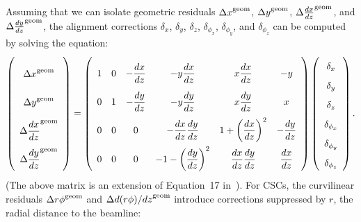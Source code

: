 Assuming that we can isolate geometric residuals ${\Delta
  x}^{\mbox{\scriptsize geom}}$, ${\Delta y}^{\mbox{\scriptsize
    geom}}$, ${\Delta \frac{dx}{dz}}^{\mbox{\scriptsize geom}}$, and
${\Delta \frac{dy}{dz}}^{\mbox{\scriptsize geom}}$, the alignment
corrections $\delta_x$, $\delta_y$, $\delta_z$, $\delta_{\phi_x}$,
$\delta_{\phi_y}$, and $\delta_{\phi_z}$ can be computed by solving
the equation:
\begin{equation}
\renewcommand{\arraystretch}{2.5}
\left(\begin{array}{c}
{\Delta x}^{\mbox{\scriptsize geom}} \\
{\Delta y}^{\mbox{\scriptsize geom}} \\
{\Delta \dfrac{dx}{dz}}^{\mbox{\scriptsize geom}} \\
{\Delta \dfrac{dy}{dz}}^{\mbox{\scriptsize geom}} \\
\end{array}\right)
=
{\renewcommand{\arraystretch}{2.5}
\left(\begin{array}{c c c c c c}
1 & 0 & -\dfrac{dx}{dz} & -y \dfrac{dx}{dz} & x \dfrac{dx}{dz} & -y \\
0 & 1 & -\dfrac{dy}{dz} & -y \dfrac{dy}{dz} & x \dfrac{dy}{dz} & x \\
0 & 0 & 0 & -\dfrac{dx}{dz} \dfrac{dy}{dz} & 1 + \left(\dfrac{dx}{dz}\right)^2 & -\dfrac{dy}{dz} \\
0 & 0 & 0 & -1 - \left(\dfrac{dy}{dz}\right)^2 & \dfrac{dx}{dz}\dfrac{dy}{dz} & \dfrac{dx}{dz}
\end{array}\right)}
\renewcommand{\arraystretch}{1.7}
\left(\begin{array}{c}
\delta_x \\
\delta_y \\
\delta_z \\
\delta_{\phi_x} \\
\delta_{\phi_y} \\
\delta_{\phi_z}
\end{array}\right) \mbox{.}
\label{eqn:dtmatrix}
\end{equation}
(The above matrix is an extension of Equation~17 in~\cite{ref:oldhip}).
For CSCs, the curvilinear residuals ${\Delta r\phi}^{\mbox{\scriptsize
geom}}$ and ${\Delta
d(r\phi)/dz}^{\mbox{\scriptsize geom}}$ introduce corrections suppressed by $r$, the radial
distance to the beamline:
